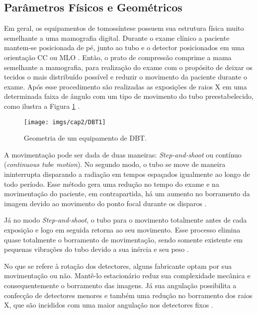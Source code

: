 \subsection{Parâmetros Físicos e Geométricos}

Em geral, os equipamentos de tomossíntese possuem sua estrutura física muito semelhante a uma mamografia digital. Durante o exame clínico a paciente mantem-se posicionada de pé, junto ao tubo e o detector posicionados em uma orientação \ac{CC} ou \ac{MLO} \cite{Niklason20185}. Então, o prato de compressão comprime a mama semelhante a mamografia, para realização do exame com o propósito de deixar os tecidos o mais distribuído possível e reduzir o movimento da paciente durante o exame. Após esse procedimento são realizadas as exposições de raios X em uma determinada faixa de ângulo com um tipo de movimento do tubo preestabelecido, como ilustra a Figura \ref{fig:imgCap2DBTEstrutura1} \cite{baker2011breast}.  

\begin{figure}[H]
	\caption{Geometria de um equipamento de \acs{DBT}.}
	\begin{center}
		\texttt{[image: imgs/cap2/DBT1]}
	\end{center}
	\label{fig:imgCap2DBTEstrutura1}
\end{figure}

A movimentação pode ser dada de duas maneiras: \textit{Step-and-shoot} ou contínuo (\textit{continuous tube motion}). No segundo modo, o tubo se move de maneira ininterrupta disparando a radiação em tempos espaçados igualmente ao longo de todo período. Esse método gera uma redução no tempo do exame e na movimentação do paciente, em contrapartida, há um aumento no borramento da imagem devido ao movimento do ponto focal durante os disparos \cite{glick2014system}. 

Já no modo \textit{Step-and-shoot}, o tubo para o movimento totalmente antes de cada exposição e logo em seguida retorna ao seu movimento. Esse processo elimina quase totalmente o borramento de movimentação, sendo somente existente em pequenas vibrações do tubo devido a sua inércia e seu peso \cite{glick2014system}.

No que se refere à rotação dos detectores, alguns fabricante optam por sua movimentação ou não. Mantê-lo estacionário reduz sua complexidade mecânica e consequentemente o borramento das imagens. Já sua angulação possibilita a confecção de detectores menores e também uma redução no borramento dos raios X, que são incididos com uma maior angulação nos detectores fixos \cite{glick2014system}. 

